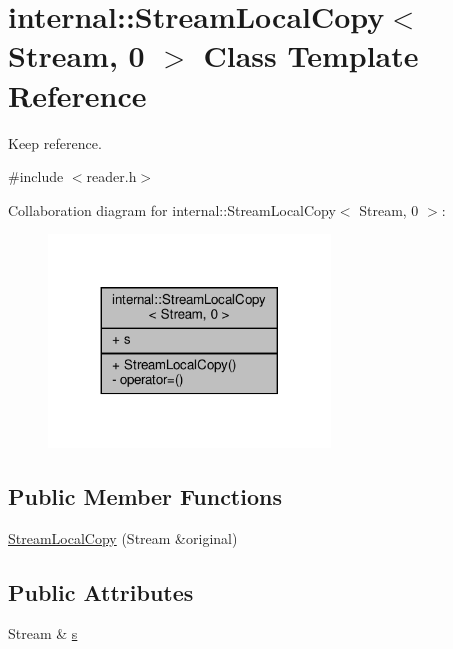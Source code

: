 \hypertarget{classinternal_1_1StreamLocalCopy_3_01Stream_00_010_01_4}{}\section{internal\+:\+:Stream\+Local\+Copy$<$ Stream, 0 $>$ Class Template Reference}
\label{classinternal_1_1StreamLocalCopy_3_01Stream_00_010_01_4}


Keep reference.  




{\ttfamily \#include $<$reader.\+h$>$}



Collaboration diagram for internal\+:\+:Stream\+Local\+Copy$<$ Stream, 0 $>$\+:
\nopagebreak
\begin{figure}[H]
\begin{center}
\leavevmode
\includegraphics[width=212pt]{classinternal_1_1StreamLocalCopy_3_01Stream_00_010_01_4__coll__graph}
\end{center}
\end{figure}
\subsection*{Public Member Functions}
\begin{DoxyCompactItemize}
\item 
\hyperlink{classinternal_1_1StreamLocalCopy_3_01Stream_00_010_01_4_ac684a7be07d79d6ddd274dc1150f4b79}{Stream\+Local\+Copy} (Stream \&original)
\end{DoxyCompactItemize}
\subsection*{Public Attributes}
\begin{DoxyCompactItemize}
\item 
Stream \& \hyperlink{classinternal_1_1StreamLocalCopy_3_01Stream_00_010_01_4_ad31147888384f4bd51eabc2d7acdc4b6}{s}
\end{DoxyCompactItemize}
